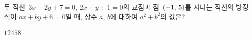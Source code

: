 두 직선~$3x-2y+7=0$, $2x-y+1=0$의 교점과 점~$(-1,\mkern3mu 5)$를 지나는 직선의 방정식이 $ax+by+6=0$일 때, 상수 $a$, $b$에 대하여 $a^2+b^2$의 값은?
\begin{choices32}{$1$}{$2$}{$4$}{$5$}{$8$}\end{choices32}
